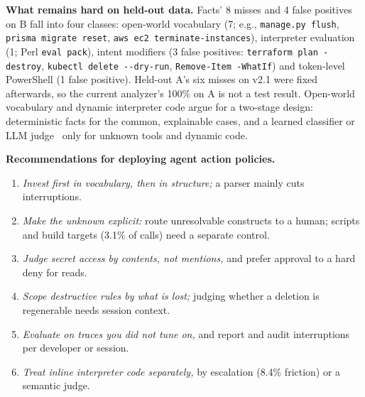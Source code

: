 \documentclass[conference]{IEEEtran}
\newcommand{\cmd}[1]{\texttt{\relscale{0.9}#1}}
\begin{document}
\textbf{What remains hard on held-out data.} Facts' 8 misses and 4 false positives on B fall into four classes: open-world vocabulary (7; e.g., \cmd{manage.py flush}, \cmd{prisma migrate reset}, \cmd{aws ec2 terminate-instances}), interpreter evaluation (1; Perl \cmd{eval pack}), intent modifiers (3 false positives: \cmd{terraform plan -destroy}, \cmd{kubectl delete -{}-dry-run}, \cmd{Remove-Item -WhatIf}) and token-level PowerShell (1 false positive). Held-out A's six misses on v2.1 were fixed afterwards, so the current analyzer's 100\% on A is not a test result. Open-world vocabulary and dynamic interpreter code argue for a two-stage design: deterministic facts for the common, explainable cases, and a learned classifier or LLM judge~\cite{anthropic2026automode,liu2026care} only for unknown tools and dynamic code.

\textbf{Recommendations for deploying agent action policies.}
\begin{enumerate}
\item \emph{Invest first in vocabulary, then in structure;} a parser mainly cuts interruptions.
\item \emph{Make the unknown explicit:} route unresolvable constructs to a human; scripts and build targets (3.1\% of calls) need a separate control.
\item \emph{Judge secret access by contents, not mentions,} and prefer approval to a hard deny for reads.
\item \emph{Scope destructive rules by what is lost;} judging whether a deletion is regenerable needs session context.
\item \emph{Evaluate on traces you did not tune on,} and report and audit interruptions per developer or session.
\item \emph{Treat inline interpreter code separately,} by escalation (8.4\% friction) or a semantic judge.
\end{enumerate}
\end{document}
